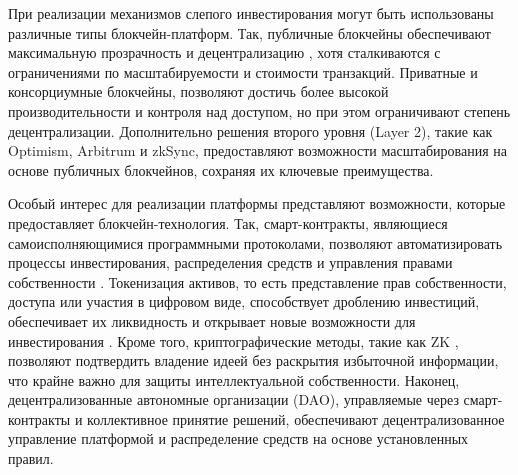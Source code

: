 \documentclass[
    14pt,
    specialist,
    candidate, %
    subf, %
    href,
    dotsinheaders=false
]{disser}
\begin{document}




При реализации механизмов слепого инвестирования могут быть использованы различные типы блокчейн-платформ. Так, публичные блокчейны обеспечивают максимальную прозрачность и децентрализацию \cite{antonopoulos2018ethereum}, хотя сталкиваются с ограничениями по масштабируемости и стоимости транзакций. Приватные и консорциумные блокчейны,  позволяют достичь более высокой производительности и контроля над доступом, но при этом ограничивают степень децентрализации. Дополнительно решения второго уровня (Layer 2), такие как Optimism, Arbitrum и zkSync, предоставляют возможности масштабирования на основе публичных блокчейнов, сохраняя их ключевые преимущества.

Особый интерес для реализации платформы представляют возможности, которые предоставляет блокчейн-технология. Так, смарт-контракты, являющиеся самоисполняющимися программными протоколами, позволяют автоматизировать процессы инвестирования, распределения средств и управления правами собственности \cite{antonopoulos2018ethereum}. Токенизация активов, то есть представление прав собственности, доступа или участия в цифровом виде, способствует дроблению инвестиций, обеспечивает их ликвидность и открывает новые возможности для инвестирования \cite{dixon2018crypto}. Кроме того, криптографические методы, такие как ZK \cite{ben2014succinct}, позволяют подтвердить владение идеей без раскрытия избыточной информации, что крайне важно для защиты интеллектуальной собственности. Наконец, децентрализованные автономные организации (DAO), управляемые через смарт-контракты и коллективное принятие решений, обеспечивают децентрализованное управление платформой и распределение средств на основе установленных правил.
\end{document}
